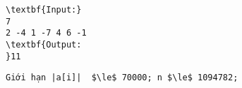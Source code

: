 \begin{verbatim}
\textbf{Input:}
7
2 -4 1 -7 4 6 -1
\textbf{Output:
}11\end{verbatim}
\begin{verbatim}
Giới hạn |a[i]|  $\le$ 70000; n $\le$ 1094782;\end{verbatim}
